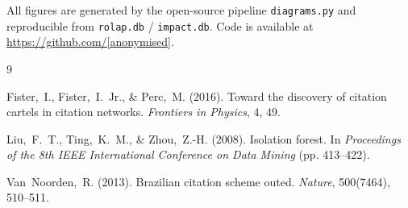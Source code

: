 \documentclass[12pt,a4paper]{article}
\begin{document}
All figures are generated by the open-source pipeline
\texttt{diagrams.py} and reproducible from
\texttt{rolap.db} / \texttt{impact.db}.
Code is available at \url{https://github.com/[anonymised]}.



\begin{thebibliography}{9}

Fister,~I., Fister,~I.~Jr., \& Perc,~M. (2016).
Toward the discovery of citation cartels in citation networks.
\textit{Frontiers in Physics}, 4, 49.

Liu,~F.~T., Ting,~K.~M., \& Zhou,~Z.-H. (2008).
Isolation forest.
In \textit{Proceedings of the 8th IEEE International Conference on
Data Mining} (pp. 413--422).

Van~Noorden,~R. (2013).
Brazilian citation scheme outed.
\textit{Nature}, 500(7464), 510--511.

\end{thebibliography}
\end{document}
